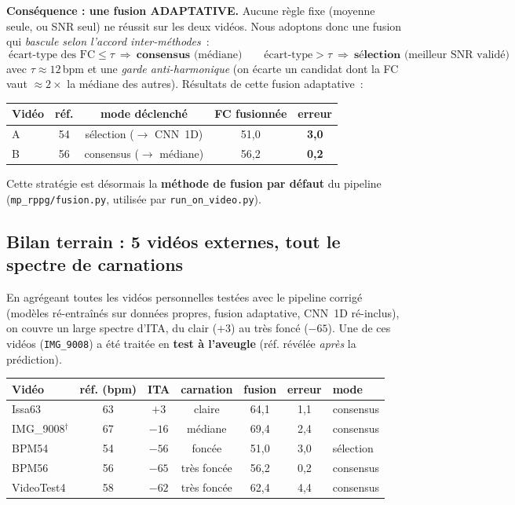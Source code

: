 \documentclass[11pt,a4paper]{article}
\newcommand{\ok}[1]{\textcolor{good}{#1}}
\begin{document}
\noindent\textbf{Conséquence : une fusion ADAPTATIVE.} Aucune règle fixe (moyenne
seule, ou SNR seul) ne réussit sur les deux vidéos. Nous adoptons donc une fusion
qui \emph{bascule selon l'accord inter-méthodes}~:
\[
\boxed{~\text{écart-type des FC} \le \tau~\Rightarrow~\textbf{consensus} \text{ (médiane)}
\qquad
\text{écart-type} > \tau~\Rightarrow~\textbf{sélection} \text{ (meilleur SNR validé)}~}
\]
avec $\tau \approx 12$\,bpm et une \emph{garde anti-harmonique} (on écarte un
candidat dont la FC vaut $\approx 2\times$ la médiane des autres). Résultats de
cette fusion adaptative~:

\begin{center}
\begin{tabular}{@{}lcccc@{}}
\toprule
Vidéo & réf. & mode déclenché & FC fusionnée & erreur \\
\midrule
A & 54 & sélection ($\rightarrow$ CNN~1D) & 51,0 & \ok{\textbf{3,0}} \\
B & 56 & consensus ($\rightarrow$ médiane) & 56,2 & \ok{\textbf{0,2}} \\
\bottomrule
\end{tabular}
\end{center}

\noindent Cette stratégie est désormais la \textbf{méthode de fusion par défaut}
du pipeline (\texttt{mp\_rppg/fusion.py}, utilisée par \texttt{run\_on\_video.py}).

\subsection{Bilan terrain : 5 vidéos externes, tout le spectre de carnations}
\label{sec:bilanterrain}

En agrégeant toutes les vidéos personnelles testées avec le pipeline corrigé
(modèles ré-entraînés sur données propres, fusion adaptative, CNN~1D ré-inclus),
on couvre un large spectre d'ITA, du clair ($+3$) au très foncé ($-65$). Une de ces
vidéos (\texttt{IMG\_9008}) a été traitée en \textbf{test à l'aveugle} (réf.
révélée \emph{après} la prédiction).

\begin{center}
\begin{tabular}{@{}lcccccl@{}}
\toprule
Vidéo & réf. (bpm) & ITA & carnation & fusion & erreur & mode \\
\midrule
Issa63               & 63 & $+3$  & claire       & 64,1 & \ok{1,1} & consensus \\
IMG\_9008$^\dagger$  & 67 & $-16$ & médiane      & 69,4 & \ok{2,4} & consensus \\
BPM54                & 54 & $-56$ & foncée       & 51,0 & \ok{3,0} & sélection \\
BPM56                & 56 & $-65$ & très foncée  & 56,2 & \ok{0,2} & consensus \\
VideoTest4           & 58 & $-62$ & très foncée  & 62,4 & 4,4 & consensus \\
\bottomrule
\end{tabular}
\end{center}
\end{document}
